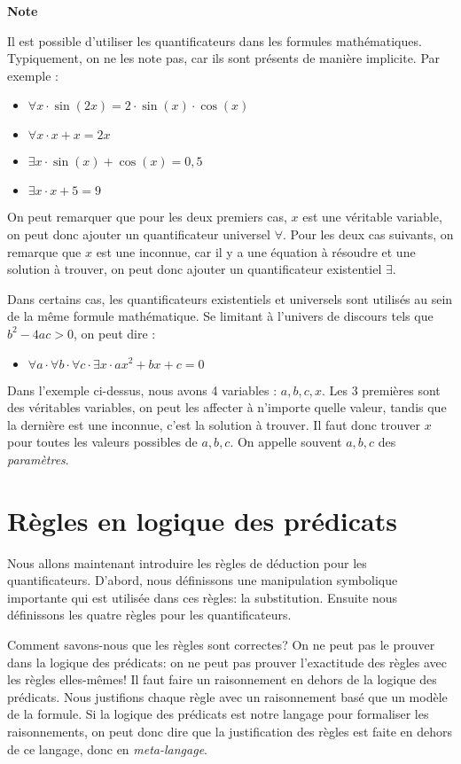 \begin{framed}
\textbf{Note}

Il est possible d'utiliser les quantificateurs  dans les formules mathématiques. Typiquement, on ne les note pas, car ils sont présents de manière implicite. Par exemple :
\begin{itemize}
\item $\forall x \cdot \sin(2x) = 2 \cdot \sin(x) \cdot \cos(x)$ 
\item $\forall x \cdot x + x = 2x$
\item $\exists x \cdot \sin(x) + \cos(x) = 0,5$
\item $\exists x \cdot x + 5 = 9$
\end{itemize} 

On peut remarquer que pour les deux premiers cas, $x$ est une véritable variable, on peut donc ajouter un quantificateur universel $\forall$. 
Pour les deux cas suivants, on remarque que $x$ est une inconnue, car il y a une équation à résoudre et une solution à trouver, on peut donc ajouter un quantificateur existentiel $\exists$.

Dans certains cas, les quantificateurs existentiels et universels sont
utilisés au sein de la même formule mathématique. Se limitant à
l'univers de discours tels que $ b^{2}-4ac > 0$, on peut dire :
\begin{itemize}
\item[] $\forall a \cdot \forall b \cdot \forall c \cdot \exists x \cdot ax^{2}+bx+c = 0$
\end{itemize}
Dans l'exemple ci-dessus, nous avons 4 variables : $a,b,c,x$. Les 3 premières sont des véritables variables, on peut les affecter à n'importe quelle valeur, tandis que la dernière est une inconnue, c'est la solution à trouver. Il faut donc trouver $x$ pour toutes les valeurs possibles de $a,b,c$.
On appelle souvent $a,b,c$ des {\em paramètres}.
\end{framed}

\section{Règles en logique des prédicats}

Nous allons maintenant introduire les règles de déduction pour les quantificateurs.
D'abord, nous définissons une manipulation symbolique importante qui est utilisée
dans ces règles: la substitution.
Ensuite nous définissons les quatre règles pour les quantificateurs.

Comment savons-nous que les règles sont correctes?
On ne peut pas le prouver dans la logique des prédicats: on ne peut pas prouver l'exactitude
des règles avec les règles elles-mêmes!
Il faut faire un raisonnement en dehors de la logique des prédicats.
Nous justifions chaque règle avec un raisonnement basé que un modèle de la formule.
Si la logique des prédicats est notre langage pour formaliser les raisonnements,
on peut donc dire que la justification des règles est faite en dehors de ce langage, donc en {\em meta-langage}.

